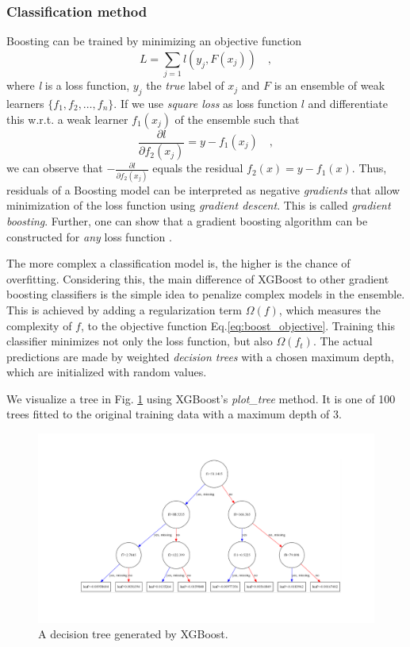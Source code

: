 \subsubsection{Classification method}
Boosting can be trained by minimizing an objective function
\begin{equation}\label{eq:boost_objective}
	L = \sum\limits_{j=1} l ( y_j,F(x_j)) \mathrm{\hspace{1em},}
\end{equation}
where \emph{l} is a loss function, $y_j$ the \emph{true} label of $x_j$ and $F$ is an ensemble of weak learners $\{f_1,f_2,\ldots,f_n\}$. If we use \emph{square loss} as loss function $l$ and differentiate this w.r.t. a weak learner $f_1(x_j)$ of the ensemble such that
\begin{equation}\label{eq:boostloss}
	\frac{\partial l}{\partial f_2(x_j)} = y - f_1(x_j) \mathrm{\hspace{1em},}
\end{equation}
we can observe that $- \frac{\partial l}{\partial f_2(x_j)}$ equals the residual $f_2(x) = y - f_1(x)$.
Thus, residuals of a Boosting model can be interpreted as negative \emph{gradients} that allow minimization of the loss function using \emph{gradient descent}. This is called \emph{gradient boosting}. Further, one can show that a gradient boosting algorithm can be constructed for \emph{any} loss function \cite{gradboost}.

The more complex a classification model is, the higher is the chance of overfitting. Considering this, the main difference of XGBoost to other gradient boosting classifiers is the simple idea to penalize complex models in the ensemble. This is achieved by adding a regularization term $\Omega(f)$, which measures the complexity of $f$, to the objective function Eq.\eqref{eq:boost_objective}. Training this classifier minimizes not only the loss function, but also $\Omega(f_t)$.
The actual predictions are made by weighted \emph{decision trees} with a chosen maximum depth, which are initialized with random values.

We visualize a tree in Fig. \ref{fig:tree} using XGBoost's \emph{plot\_tree} method. It is one of 100 trees fitted to the original training data with a maximum depth of 3.
\begin{figure}[h]
\begin{center}
\includegraphics[trim=146 100 118 90, clip, width=\textwidth]{images/tree.pdf}
\caption{A decision tree generated by XGBoost.}
\label{fig:tree}
\end{center}
\end{figure}
